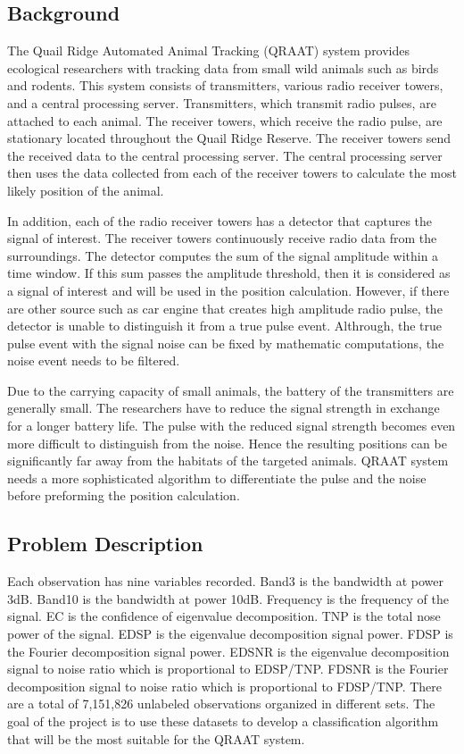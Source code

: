 \documentclass[twoside]{article}
\begin{document}
\subsection{Background}
The Quail Ridge Automated Animal Tracking (QRAAT) system provides ecological researchers with tracking data from small wild animals such as birds and rodents. This system consists of transmitters, various radio receiver towers, and a central processing server. Transmitters, which transmit radio pulses, are attached to each animal. The receiver towers, which receive the radio pulse, are stationary located throughout the Quail Ridge Reserve. The receiver towers send the received data to the central processing server. The central processing server then uses the data collected from each of the receiver towers to calculate the most likely position of the animal. 

In addition, each of the radio receiver towers has a detector that captures the signal of interest. The receiver towers continuously receive radio data from the surroundings. The detector computes the sum of the signal amplitude within a time window. If this sum passes the amplitude threshold, then it is considered as a signal of interest and will be used in the position calculation. However, if there are other source such as car engine that creates high amplitude radio pulse, the detector is unable to distinguish it from a true pulse event. Althrough, the true pulse event with the signal noise can be fixed by mathematic computations, the noise event needs to be filtered.

Due to the carrying capacity of small animals, the battery of the transmitters are generally small. The researchers have to reduce the signal strength in exchange for a longer battery life. The pulse with the reduced signal strength becomes even more difficult to distinguish from the noise. Hence the resulting positions can be significantly far away from the habitats of the targeted animals. QRAAT system needs a more sophisticated algorithm to differentiate the pulse and the noise before preforming the position calculation.



\subsection{Problem Description}
Each observation has nine variables recorded. Band3 is the bandwidth at power 3dB. Band10 is the bandwidth at power 10dB. Frequency is the frequency of the signal. EC is the confidence of eigenvalue decomposition. TNP is the total nose power of the signal. EDSP is the eigenvalue decomposition signal power. FDSP is the Fourier decomposition signal power. EDSNR is the eigenvalue decomposition signal to noise ratio which is proportional to EDSP/TNP. FDSNR is the Fourier decomposition signal to noise ratio which is proportional to FDSP/TNP. There are a total of 7,151,826 unlabeled observations organized in different sets. The goal of the project is to use these datasets to develop a classification algorithm that will be the most suitable for the QRAAT system. 
\end{document}
